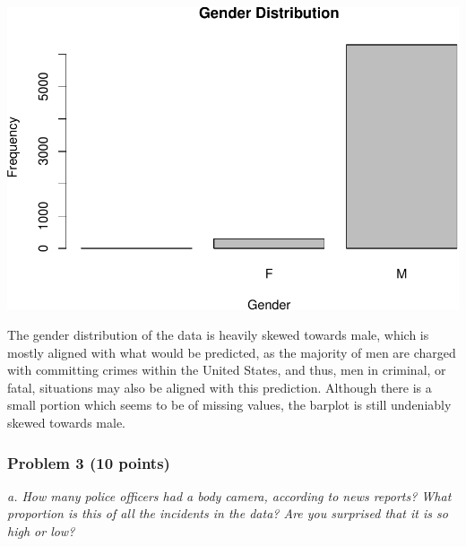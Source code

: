 \documentclass[
]{article}
\newenvironment{Shaded}{\begin{snugshade}}{\end{snugshade}}
\newcommand{\AttributeTok}[1]{\textcolor[rgb]{0.77,0.63,0.00}{#1}}
\newcommand{\FunctionTok}[1]{\textcolor[rgb]{0.00,0.00,0.00}{#1}}
\newcommand{\NormalTok}[1]{#1}
\newcommand{\OtherTok}[1]{\textcolor[rgb]{0.56,0.35,0.01}{#1}}
\newcommand{\SpecialCharTok}[1]{\textcolor[rgb]{0.00,0.00,0.00}{#1}}
\newcommand{\StringTok}[1]{\textcolor[rgb]{0.31,0.60,0.02}{#1}}
\begin{document}
\begin{Shaded}
\end{Shaded}

\includegraphics{Journal_files/figure-latex/unnamed-chunk-27-1.pdf}

The gender distribution of the data is heavily skewed towards male,
which is mostly aligned with what would be predicted, as the majority of
men are charged with committing crimes within the United States, and
thus, men in criminal, or fatal, situations may also be aligned with
this prediction. Although there is a small portion which seems to be of
missing values, the barplot is still undeniably skewed towards male.

\hypertarget{problem-3-10-points}{%
\subsubsection{Problem 3 (10 points)}\label{problem-3-10-points}}

\emph{a. How many police officers had a body camera, according to news
reports? What proportion is this of all the incidents in the data? Are
you surprised that it is so high or low?}
\end{document}
